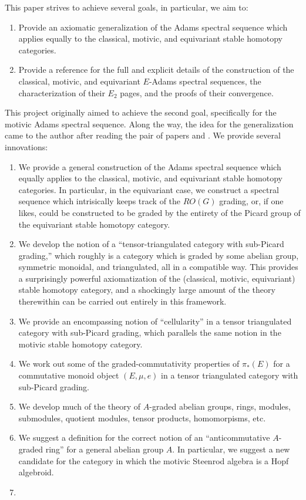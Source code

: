 \documentclass[../main.tex]{subfiles}
\begin{document}
This paper strives to achieve several goals, in particular, we aim to:
\begin{enumerate}
    \item Provide an axiomatic generalization of the Adams spectral sequence which applies equally to the classical, motivic, and equivariant stable homotopy categories.
    \item Provide a reference for the full and explicit details of the construction of the classical, motivic, and equivariant $E$-Adams spectral sequences, the characterization of their $E_2$ pages, and the proofs of their convergence.
\end{enumerate}
This project originally aimed to achieve the second goal, specifically for the motivic Adams spectral sequence. Along the way, the idea for the generalization came to the author after reading the pair of papers \cite{Dugger_2014} and \cite{DDIO}. We provide several innovations:
\begin{enumerate}
    \item We provide a general construction of the Adams spectral sequence which equally applies to the classical, motivic, and equivariant stable homotopy categories. In particular, in the equivariant case, we construct a spectral sequence which intrisically keeps track of the $RO(G)$ grading, or, if one likes, could be constructed to be graded by the entirety of the Picard group of the equivariant stable homotopy category.
    \item We develop the notion of a ``tensor-triangulated category with sub-Picard grading,'' which roughly is a category which is graded by some abelian group, symmetric monoidal, and triangulated, all in a compatible way. This provides a surprisingly powerful axiomatization of the (classical, motivic, equivariant) stable homotopy category, and a shockingly large amount of the theory therewithin can be carried out entirely in this framework.
    \item We provide an encompassing notion of ``cellularity'' in a tensor triangulated category with sub-Picard grading, which parallels the same notion in the motivic stable homotopy category.
    \item We work out some of the graded-commutativity properties of $\pi_*(E)$ for a commutative monoid object $(E,\mu,e)$ in a tensor triangulated category with sub-Picard grading.
    \item We develop much of the theory of $A$-graded abelian groups, rings, modules, submodules, quotient modules, tensor products, homomorpisms, etc.
    \item We suggest a definition for the correct notion of an ``anticommutative $A$-graded ring'' for a general abelian group $A$. In particular, we suggest a new candidate for the category in which the motivic Steenrod algebra is a Hopf algebroid.
    \item{}
\end{enumerate}
\end{document}
